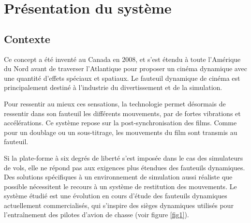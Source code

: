 

\section{Présentation du système}

\subsection{Contexte}

Ce concept a été inventé au Canada en 2008, et s'est étendu à toute l'Amérique du Nord avant de traverser l'Atlantique pour proposer un cinéma dynamique avec une quantité d'effets spéciaux et spatiaux. Le fauteuil dynamique de cinéma est principalement destiné à l'industrie du divertissement et de la simulation.

Pour ressentir au mieux ces sensations, la technologie permet désormais de ressentir dans son fauteuil les différents mouvements, par de fortes vibrations et accélérations. Ce système repose sur la post-synchronisation des films. Comme pour un doublage ou un sous-titrage, les mouvements du film sont transmis au fauteuil.

Si la plate-forme à six degrés de liberté s'est imposée dans le cas des simulateurs de vols, elle ne répond pas aux exigences plus étendues des fauteuils dynamiques. Des solutions spécifiques à un environnement de simulation aussi réaliste que possible nécessitent le recours à un système de restitution des mouvements. Le système étudié est une évolution en cours d'étude des fauteuils dynamiques actuellement commercialisés, qui s'inspire des sièges dynamiques utilisés pour l'entraînement des pilotes d'avion de chasse (voir figure \ref{fig1}).

